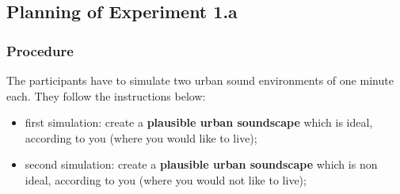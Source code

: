 \documentclass[twoside,twocolumn]{article}
\begin{document}
\subsection{Planning of Experiment 1.a}
\label{sec:xp1a_plan}

\subsubsection*{Procedure}

%
%
%
%
%

The participants have to simulate two urban sound environments of one minute each. They follow the instructions below:
\begin{itemize}
\item  first simulation: create a \textbf{plausible urban soundscape} which is ideal, according to you (where you would like to live);
\item second simulation: create a \textbf{plausible urban soundscape} which is non ideal, according to you (where you would not like to live);
\end{itemize}
\end{document}
